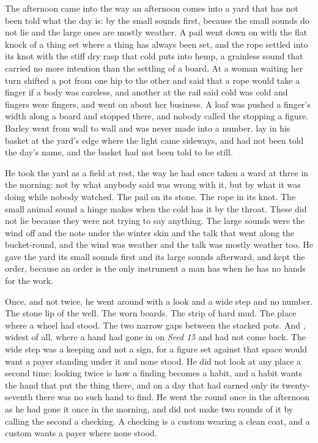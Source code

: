 The afternoon came into  the way an afternoon comes into a yard that has not been told what the day is: by the small sounds first, because the small sounds do not lie and the large ones are mostly weather. A pail went down on  with the flat knock of a thing set where a thing has always been set, and the rope settled into its knot with the stiff dry rasp that cold puts into hemp, a grainless sound that carried no more intention than the settling of a board. At  a woman waiting her turn shifted a pot from one hip to the other and said that a rope would take a finger if a body was careless, and another at the rail said cold was cold and fingers were fingers, and went on about her business. A loaf was pushed a finger's width along a board and stopped there, and nobody called the stopping a figure. Barley went from wall to wall and was never made into a number.  lay in his basket at the yard's edge where the light came sideways, and had not been told the day's name, and the basket had not been told to be still.

He took the yard as a field at rest, the way he had once taken a ward at three in the morning: not by what anybody said was wrong with it, but by what it was doing while nobody watched. The pail on its stone. The rope in its knot. The small animal sound a hinge makes when the cold has it by the throat. These did not lie because they were not trying to say anything. The large sounds were the wind off  and the note under the winter skin and the talk that went along the bucket-round, and the wind was weather and the talk was mostly weather too. He gave the yard its small sounds first and its large sounds afterward, and kept the order, because an order is the only instrument a man has when he has no hands for the work.

Once, and not twice, he went around  with a look and a wide step and no number. The stone lip of the well. The worn boards. The strip of hard mud. The place where a wheel had stood. The two narrow gaps between the stacked pots. And , widest of all, where a hand had gone in on \emph{Seed 15} and had not come back. The wide step was a keeping and not a sign, for a figure set against that space would want a payer standing under it and none stood. He did not look at any place a second time: looking twice is how a finding becomes a habit, and a habit wants the hand that put the thing there, and on a day that had earned only its twenty-seventh there was no such hand to find. He went the round once in the afternoon as he had gone it once in the morning, and did not make two rounds of it by calling the second a checking. A checking is a custom wearing a clean coat, and a custom wants a payer where none stood.

